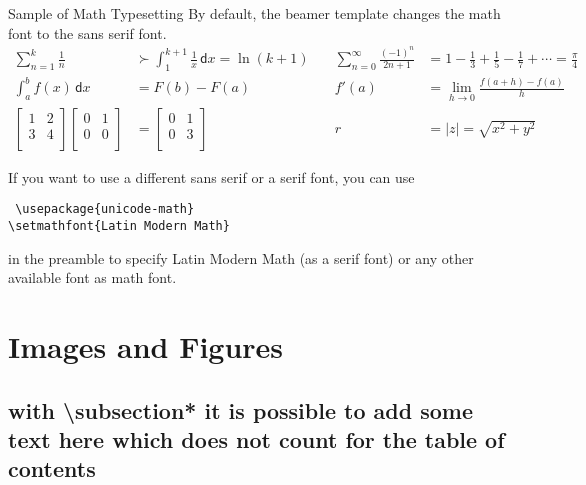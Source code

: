 \begin{frame}[minimal]{Sample of Math Typesetting}
By default, the beamer template changes the math font to the sans serif font.
	\begin{align*}
		\sum_{n=1}^k \frac{1}{n} &\succ \int_1^{k+1} \frac{1}{x}\,  \mathsf{d}x = \ln(k+1) \quad & 
		\sum_{n = 0}^\infty \frac{(-1)^{n}}{2n+1} &= 1 - \frac{1}{3} + \frac{1}{5} - \frac{1}{7} + \cdots = \frac{\pi}{4} \\
		\int_a^b \! f(x)\, \mathsf{d}x &= F(b) - F(a) & 	f'(a)&=\lim_{h\to 0}\frac{f(a+h)-f(a)}{h}\\
		\begin{bmatrix} 1 & 2\\ 3 & 4\\ \end{bmatrix} \begin{bmatrix} 0 & 1\\ 0 & 0\\ \end{bmatrix} &= \begin{bmatrix} 0 & 1\\ 0 & 3\\ \end{bmatrix} &
		\textstyle r&=|z|=\sqrt{x^2+y^2}
	\end{align*}
	\vspace{1ex}
	
	If you want to use a different sans serif or a serif font, you can use 

	\begin{center}
			\texttt{
	\textbackslash usepackage\{unicode-math\}\\
\textbackslash setmathfont\{Latin Modern Math\}}
	\end{center}

	 in the preamble to specify Latin Modern Math (as a serif font) or any other available font as math font. 
\end{frame}


\section{Images and Figures}
\subsection*{with \textbackslash subsection* it is possible to add some text here which does not count for the table of contents}

\rptusectionpage

